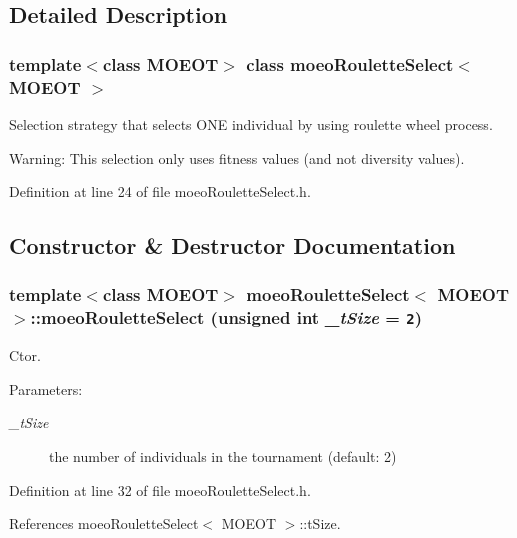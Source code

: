 \subsection{Detailed Description}
\subsubsection*{template$<$class MOEOT$>$ class moeo\-Roulette\-Select$<$ MOEOT $>$}

Selection strategy that selects ONE individual by using roulette wheel process. 

\begin{Desc}
\item[Warning:]This selection only uses fitness values (and not diversity values). \end{Desc}




Definition at line 24 of file moeo\-Roulette\-Select.h.

\subsection{Constructor \& Destructor Documentation}
\subsubsection{\setlength{\rightskip}{0pt plus 5cm}template$<$class MOEOT$>$ \bf{moeo\-Roulette\-Select}$<$ MOEOT $>$::\bf{moeo\-Roulette\-Select} (unsigned int {\em \_\-t\-Size} = {\tt 2})\hspace{0.3cm}{\tt  [inline]}}\label{classmoeoRouletteSelect_4caa45f4c9d1ad2949cc14d2c21b77ea}


Ctor. 

\begin{Desc}
\item[Parameters:]
\begin{description}
\item[{\em \_\-t\-Size}]the number of individuals in the tournament (default: 2) \end{description}
\end{Desc}


Definition at line 32 of file moeo\-Roulette\-Select.h.

References moeo\-Roulette\-Select$<$ MOEOT $>$::t\-Size.

